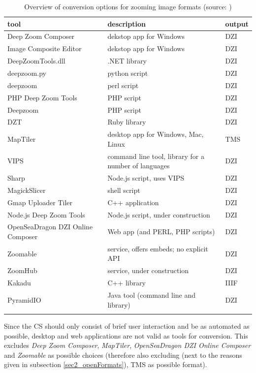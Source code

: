 \begin{longtable}{| p{3cm} | p{4cm} | p{2.5cm} |}
	\hline
	\textbf{tool} & \textbf{description} & \textbf{output} \\ \hline
	Deep Zoom Composer & dekstop app for Windows & DZI \\ \hline
	Image Composite Editor & dekstop app for Windows & DZI \\ \hline
	DeepZoomTools.dll & .NET library & DZI \\ \hline
	deepzoom.py & python script& DZI \\ \hline
	deepzoom & perl script & DZI \\ \hline
	PHP Deep Zoom Tools & PHP script & DZI \\ \hline
	Deepzoom & PHP script & DZI \\ \hline
	DZT & Ruby library & DZI \\ \hline
	MapTiler &  desktop app for Windows, Mac, Linux & TMS \\ \hline
	VIPS & command line tool, library for a number of languages & DZI \\ \hline
	Sharp & Node.js script, uses VIPS & DZI \\ \hline
	MagickSlicer & shell script & DZI \\ \hline
	Gmap Uploader Tiler & C++ application & DZI \\ \hline
	Node.js Deep Zoom Tools & Node.js script, under construction & DZI \\ \hline
	OpenSeaDragon DZI Online Composer & Web app (and PERL, PHP scripts) & DZI \\ \hline
	Zoomable & service, offers embeds; no explicit API & DZI \\ \hline
	ZoomHub & service, under construction & DZI \\ \hline
	Kakadu & C++ library & IIIF \\ \hline
	PyramidIO & Java tool (command line and library) & DZI \\ \hline
	\caption{Overview of conversion options for zooming image formats (source: \cite{web:openseadragon})}
	\label{tab3_convOptions}
\end{longtable}

Since the CS should only consist of brief user interaction and be as automated as possible, desktop and web applications are not valid as tools for conversion. This excludes \emph{Deep Zoom Composer}, \emph{MapTiler}, \emph{OpenSeaDragon DZI Online Composer} and \emph{Zoomable} as possible choices (therefore also excluding (next to the reasons given in subsection \ref{sec2_openFormats}), TMS as possible format).

